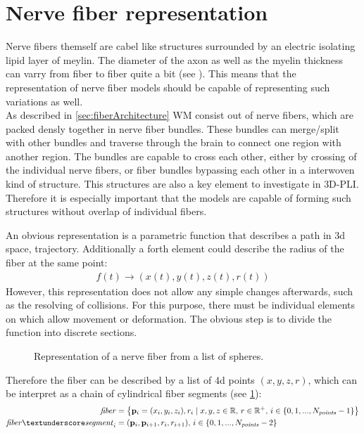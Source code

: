 \section{Nerve fiber representation}
\label{sec:nerve_fiber_representation}
% 
Nerve fibers themself are cabel like structures surrounded by an electric isolating lipid layer of meylin.
The diameter of the axon as well as the myelin thickness can varry from fiber to fiber quite a bit (see \dummy{}).
This means that the representation of nerve fiber models should be capable of representing such variations as well.\\
% 
As described in \cref{sec:fiberArchitecture} \ac{WM} consist out of nerve fibers, which are packed densly together in nerve fiber bundles.
These bundles can merge/split with other bundles and traverse through the brain to connect one region with another region.
The bundles are capable to cross each other, either by crossing of the individual nerve fibers, or fiber bundles bypassing each other in a interwoven kind of structure.
This structures are also a key element to investigate in \ac{3D-PLI}.
Therefore it is especially important that the models are capable of forming such structures without overlap of individual fibers.
\par
% 
An obvious representation is a parametric function that describes a path in 3d space, \ie{} trajectory.
Additionally a forth element could describe the radius of the fiber at the same point:
\begin{align}
f(t) \rightarrow (x(t),y(t), z(t), r(t))
\end{align}
However, this representation does not allow any simple changes afterwards, such as the resolving of collisions.
For this purpose, there must be individual elements on which allow movement or deformation.
The obvious step is to divide the function into discrete sections.
% 
\begin{figure}[!t]
    \setlength{\tikzwidth}{0.85\textwidth}
    \centering
	\caption[]{Representation of a nerve fiber from a list of spheres.}
	\label{fig:fiberReb}
\end{figure}
% 
Therefore the fiber can be described by a list of 4d points $(x,y,z,r)$, which can be interpret as a chain of cylindrical fiber segments (see \cref{fig:fiberReb}):
\begin{align}
\begin{split}
\mathit{fiber} &= \left\{ \vec{p}_i=(x_i,y_i,z_i), r_i \mid x,y,z \in \mathbb{R}, \, r \in \mathbb{R^+}, \, i \in \{0,1,...,N_{\mathit{points}}-1\}\right\} \\
\mathit{fiber\tu segment}_i &= (\vec{p}_i, \vec{p}_{i+1}, r_i, r_{i+1}), \, i \in \{0,1,...,N_{\mathit{points}}-2\}
\end{split}
\end{align}
